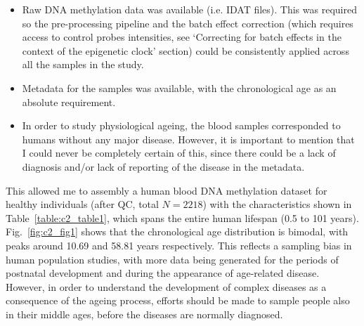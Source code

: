 \begin{itemize}
	
	\item Raw DNA methylation data was available (i.e. IDAT files). This was required so the pre-processing pipeline and the batch effect correction (which requires access to control probes intensities, see `Correcting for batch effects in the context of the epigenetic clock' section) could be consistently applied across all the samples in the study.
	
	\item Metadata for the samples was available, with the chronological age as an absolute requirement. 
	
	\item In order to study physiological ageing, the blood samples corresponded to humans without any major disease. However, it is important to mention that I could never be completely certain of this, since there could be a lack of diagnosis and/or lack of reporting of the disease in the metadata. 
	
\end{itemize}

\smallskip

This allowed me to assembly a human blood DNA methylation dataset for healthy individuals (after \acrshort{QC}, total $N=2218$) with the characteristics shown in Table~\ref{table:c2_table1}, which spans the entire human lifespan (0.5 to 101 years). Fig.~\ref{fig:c2_fig1} shows that the chronological age distribution is bimodal, with peaks around 10.69 and 58.81 years respectively. This reflects a sampling bias in human population studies, with more data being generated for the periods of postnatal development and during the appearance of age-related disease. However, in order to understand the development of complex diseases as a consequence of the ageing process, efforts should be made to sample people also in their middle ages, before the diseases are normally diagnosed.   


